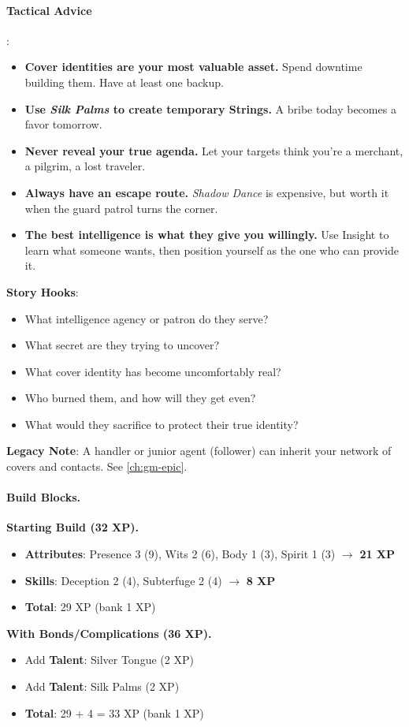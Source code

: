 \paragraph{Tactical Advice}:
\begin{itemize}
\item \textbf{Cover identities are your most valuable asset.} Spend downtime building them. Have at least one backup.
\item \textbf{Use \emph{Silk Palms} to create temporary Strings.} A bribe today becomes a favor tomorrow.
\item \textbf{Never reveal your true agenda.} Let your targets think you're a merchant, a pilgrim, a lost traveler.
\item \textbf{Always have an escape route.} \emph{Shadow Dance} is expensive, but worth it when the guard patrol turns the corner.
\item \textbf{The best intelligence is what they give you willingly.} Use Insight to learn what someone wants, then position yourself as the one who can provide it.
\end{itemize}

\textbf{Story Hooks}:
\begin{itemize}
\item What intelligence agency or patron do they serve?
\item What secret are they trying to uncover?
\item What cover identity has become uncomfortably real?
\item Who burned them, and how will they get even?
\item What would they sacrifice to protect their true identity?
\end{itemize}

\textbf{Legacy Note}: A handler or junior agent (follower) can inherit your network of covers and contacts. See \ref{ch:gm-epic}.

\paragraph{Build Blocks.}
\textbf{Starting Build (32 XP).}
\begin{itemize}
\item \textbf{Attributes}: Presence 3 (9), Wits 2 (6), Body 1 (3), Spirit 1 (3) \(\rightarrow\) \textbf{21 XP}
\item \textbf{Skills}: Deception 2 (4), Subterfuge 2 (4) \(\rightarrow\) \textbf{8 XP}
\item \textbf{Total}: 29 XP (bank 1 XP)
\end{itemize}
\textbf{With Bonds/Complications (36 XP).}
\begin{itemize}
\item Add \textbf{Talent}: Silver Tongue (2 XP)
\item Add \textbf{Talent}: Silk Palms (2 XP)
\item \textbf{Total}: 29 + 4 = 33 XP (bank 1 XP)
\end{itemize}

